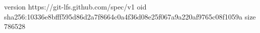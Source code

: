 version https://git-lfs.github.com/spec/v1
oid sha256:10336e8bfff595d86d2a7f8664c0a4f36d08e25f067a9a220af9765c08f1059a
size 786528
